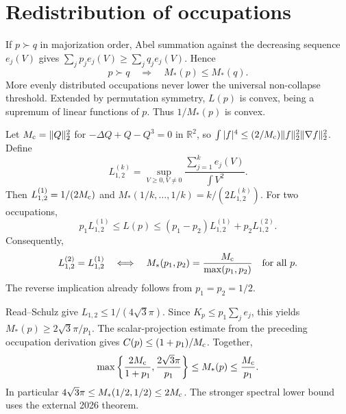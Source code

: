 \documentclass[11pt,a4paper]{article}
\newcommand{\R}{\mathbb R}
\newcommand{\mc}{M_{\rm c}}
\begin{document}
\section{Redistribution of occupations}
If $p\succ q$ in majorization order, Abel summation against the decreasing sequence $e_j(V)$ gives $\sum_jp_je_j(V)\ge\sum_jq_je_j(V)$. Hence
\begin{equation}\label{eq:majorization}
 p\succ q\quad\Longrightarrow\quad M_*(p)\le M_*(q).
\end{equation}
More evenly distributed occupations never lower the universal non-collapse threshold. Extended by permutation symmetry, $L(p)$ is convex, being a supremum of linear functions of $p$. Thus $1/M_*(p)$ is convex.

Let $\mc=\|Q\|_2^2$ for $-\Delta Q+Q-Q^3=0$ in $\R^2$, so $\int|f|^4\le(2/\mc)\|f\|_2^2\|\nabla f\|_2^2$. Define
\[
 L_{1,2}^{(k)}=\sup_{V\ge0,V\ne0}\frac{\sum_{j=1}^ke_j(V)}{\int V^2}.
\]
Then $L_{1,2}^{(1)}=1/(2\mc)$ and $M_*(1/k,\ldots,1/k)=k/(2L_{1,2}^{(k)})$. For two occupations,
\[
 p_1L_{1,2}^{(1)}\le L(p)\le(p_1-p_2)L_{1,2}^{(1)}+p_2L_{1,2}^{(2)}.
\]
Consequently,
\[
 L_{1,2}^{(2)}=L_{1,2}^{(1)}
 \quad\Longleftrightarrow\quad
 M_*(p_1,p_2)=\frac{\mc}{\max(p_1,p_2)}\quad\hbox{for all }p.
\]
The reverse implication already follows from $p_1=p_2=1/2$.

Read--Schulz \cite[Theorem 2]{RS} give $L_{1,2}\le1/(4\sqrt3\pi)$. Since $K_p\le p_1\sum_je_j$, this yields $M_*(p)\ge2\sqrt3\pi/p_1$. The scalar-projection estimate from the preceding occupation derivation gives $C(p)\le(1+p_1)/\mc$. Together,
\begin{equation}\label{eq:bounds}
 \max\left\{\frac{2\mc}{1+p_1},\frac{2\sqrt3\pi}{p_1}\right\}
 \le M_*(p)\le\frac{\mc}{p_1}.
\end{equation}
In particular $4\sqrt3\pi\le M_*(1/2,1/2)\le2\mc$. The stronger spectral lower bound uses the external 2026 theorem.
\end{document}
